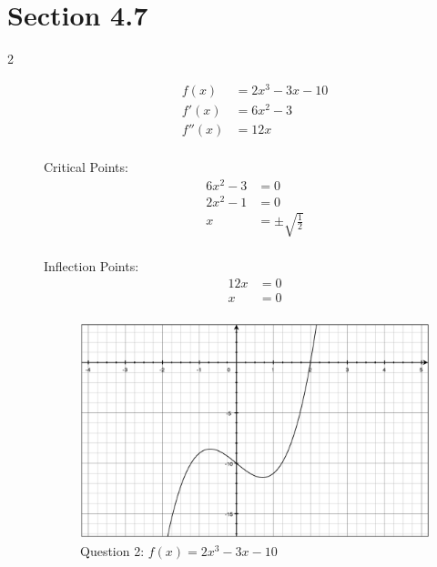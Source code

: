 \documentclass[fleqn]{exam}
\begin{document}
\section{Section 4.7}

\begin{description}

\item[2]
\begin{align*}
  f(x)  &= 2x^3 - 3x - 10 \\
  f'(x) &= 6x^2 - 3 \\
  f''(x) &= 12x \\
\end{align*}

Critical Points:
\begin{align*}
  6x^2 - 3 &= 0 \\
  2x^2 - 1 &= 0 \\
  x &= \pm \sqrt{\frac{1}{2}} \\
\end{align*}

Inflection Points:
\begin{align*}
  12x &= 0 \\
  x &= 0 \\
\end{align*}

\begin{itemize*}
  \item Increasing: $\left(-\infty, -\frac{1}{\sqrt{2}} \right] \cup \left[\frac{1}{\sqrt{2}}, \infty \right)$
  \item Concave up: $(0, \infty)$
\end{itemize*}

\begin{figure}[H]
  \centering
  \includegraphics[scale=.3]{4.7.2.eps}
  \caption*{Question 2: $f(x) = 2x^3 - 3x - 10$}
\end{figure}


\end{description}
\end{document}

